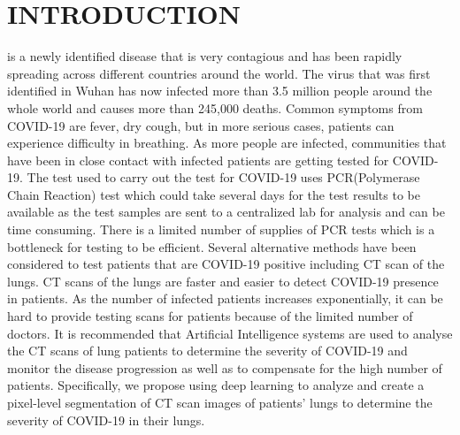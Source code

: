 \section{INTRODUCTION}

  is a newly identified disease that is very contagious and has been rapidly spreading across different countries around the world. The virus that was first identified in Wuhan has now infected more than 3.5 million people around the whole world and causes more than 245,000 deaths. Common symptoms from COVID-19 are fever, dry cough, but in more serious cases, patients can experience difficulty in breathing. As more people are infected, communities that have been in close contact with infected patients are getting tested for COVID-19. The test used to carry out the test for COVID-19 uses PCR(Polymerase Chain Reaction) test which could take several days for the test results to be available as the test samples are sent to a centralized lab for analysis and can be time consuming. There is a limited number of supplies of PCR tests which is a bottleneck for testing to be efficient. Several alternative methods have been considered to test patients that are COVID-19 positive including CT scan of the lungs. CT scans of the lungs are faster and easier to detect COVID-19 presence in patients. As the number of infected patients increases exponentially, it can be hard to provide testing scans for patients because of the limited number of doctors. It is recommended that Artificial Intelligence systems are used to analyse the CT scans of lung patients to determine the severity of COVID-19 and monitor the disease progression as well as to compensate for the high number of patients. Specifically, we propose using deep learning to analyze and create a pixel-level segmentation of CT scan images of patients’ lungs to determine the severity of COVID-19 in their lungs.
